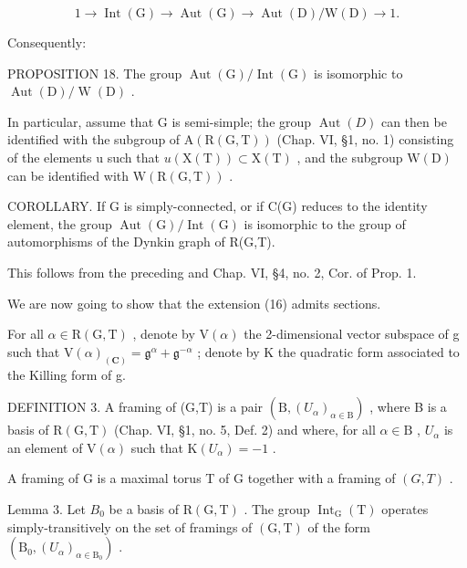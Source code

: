 \[
1 \to \operatorname{Int} (\mathrm{G}) \to \operatorname{Aut} (\mathrm{G}) \to \operatorname{Aut} (\mathrm{D}) / \mathrm{W} (\mathrm{D}) \to 1.\tag{16}
\]

Consequently:

PROPOSITION 18. The group \(\operatorname{Aut}(\mathrm{G}) / \operatorname{Int}(\mathrm{G})\) is isomorphic to \(\operatorname{Aut}(\mathrm{D}) / \operatorname{W}(\mathrm{D})\) .

In particular, assume that G is semi-simple; the group \(\operatorname{Aut}(D)\) can then be identified with the subgroup of \(\mathrm{A}(\mathrm{R}(\mathrm{G},\mathrm{T}))\) (Chap. VI, §1, no. 1) consisting of the elements u such that \(u(\mathrm{X}(\mathrm{T})) \subset \mathrm{X}(\mathrm{T})\) , and the subgroup \(\mathrm{W}(\mathrm{D})\) can be identified with \(\mathrm{W}(\mathrm{R}(\mathrm{G},\mathrm{T}))\) .

COROLLARY. If G is simply-connected, or if C(G) reduces to the identity element, the group \(\operatorname{Aut}(\mathrm{G})/\operatorname{Int}(\mathrm{G})\) is isomorphic to the group of automorphisms of the Dynkin graph of R(G,T).

This follows from the preceding and Chap. VI, §4, no. 2, Cor. of Prop. 1.

We are now going to show that the extension (16) admits sections.

For all \(\alpha\in\mathrm{R}(\mathrm{G},\mathrm{T})\) , denote by \(\mathrm{V}(\alpha)\) the 2-dimensional vector subspace of g such that \(\mathrm{V}(\alpha)_{(\mathbf{C})}=\mathfrak{g}^{\alpha}+\mathfrak{g}^{-\alpha}\) ; denote by K the quadratic form associated to the Killing form of g.

DEFINITION 3. A framing of (G,T) is a pair \((\mathrm{B},(U_{\alpha})_{\alpha \in \mathrm{B}})\) , where B is a basis of \(\mathrm{R}(\mathrm{G},\mathrm{T})\) (Chap. VI, §1, no. 5, Def. 2) and where, for all \(\alpha \in \mathrm{B}\) , \(U_{\alpha}\) is an element of \(\mathrm{V}(\alpha)\) such that \(\mathrm{K}(U_{\alpha}) = -1\) .

A framing of G is a maximal torus T of G together with a framing of \((G, T)\) .

Lemma 3. Let \(B_{0}\) be a basis of \(\mathrm{R}(\mathrm{G},\mathrm{T})\) . The group \(\operatorname{Int}_{\mathrm{G}}(\mathrm{T})\) operates simply-transitively on the set of framings of \((\mathrm{G},\mathrm{T})\) of the form \((\mathrm{B}_{0},(U_{\alpha})_{\alpha\in\mathrm{B}_{0}})\) .

